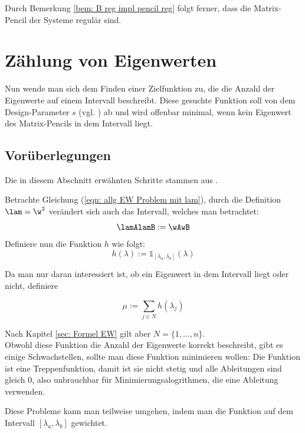 \documentclass[a4paper,12pt]{report}
\newcommand{\1}{\mathds{1}}
\theoremstyle{plain} %
\theoremstyle{definition} %
\theoremstyle{remark}
\begin{document}
            Durch Bemerkung \ref{bem: B reg impl pencil reg} folgt ferner, dass die Matrix-Pencil der Systeme regulär sind.

\chapter{Zählung von Eigenwerten}
\label{sec: EW Zählung}
      Nun wende man sich dem Finden einer Zielfunktion zu, die die Anzahl der Eigenwerte auf einem Intervall beschreibt.
      Diese gesuchte Funktion soll von dem Design-Parameter $s$ (vgl. \cite[S. 2]{hauptteilTkachuk}) ab und wird offenbar minimal,
      wenn kein Eigenwert des Matrix-Pencils in dem Intervall liegt.

      \section{Vorüberlegungen}
            Die in diesem Abschnitt erwähnten Schritte stammen aus \cite[S. 2-4]{hauptteilTkachuk}.

            Betrachte Gleichung (\ref{eqn: allg EW Problem mit lam}), durch die Definition $\lam = \w^2$ verändert sich auch das Intervall, welches man betrachtet:
            $$\lamAlamB:=\wAwB$$
            Definiere nun die Funktion $h$ wie folgt:
            $$h(\lambda):=\1_{[\lambda_a,\lambda_b]}(\lambda)$$

            Da man nur daran interessiert ist, ob ein Eigenwert in dem Intervall liegt oder nicht, definiere

            $$\mu := \sum_{j\in N} h(\lambda_j)$$

            Nach Kapitel \ref{sec: Formel EW} gilt aber $N=\{1,\dots,n\}$.\\
            Obwohl diese Funktion die Anzahl der Eigenwerte korrekt beschreibt, gibt es einige Schwachstellen, sollte man diese Funktion minimieren wollen:
            Die Funktion ist eine Treppenfunktion, damit ist sie nicht stetig und alle Ableitungen sind gleich 0, also unbrauchbar für Minimierungsalogrithmen, die eine Ableitung verwenden.

            Diese Probleme kann man teilweise umgehen, indem man die Funktion auf dem Intervall $[\lambda_a, \lambda_b]$ gewichtet.
\end{document}
